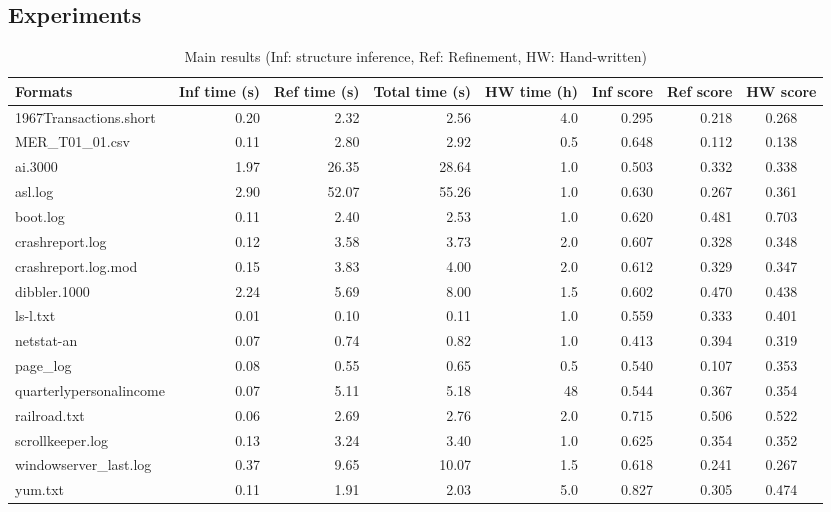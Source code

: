 \subsection{Experiments}
\begin{table*}
\begin{center}
\begin{tabular}{|l||r|r|r|r||r|r|c|} \hline
Formats 	 & Inf time (s) 	& Ref time (s) 	& Total time (s) & HW time (h) & Inf score 	&Ref score	& HW score \\ \hline \hline
1967Transactions.short & 0.20&      2.32&      2.56 	& 4.0 & 0.295 	&0.218 		&0.268		 \\ \hline
MER\_T01\_01.csv & 0.11&      2.80&      2.92 	& 0.5 & 0.648 	&0.112		&0.138		 \\ \hline
ai.3000          & 1.97&      26.35&     28.64	& 1.0 & 0.503	&0.332		&0.338		 \\ \hline
asl.log          & 2.90&      52.07&     55.26	& 1.0 & 0.630	&0.267		&0.361		 \\ \hline
boot.log         & 0.11&      2.40&      2.53 	& 1.0 & 0.620	&0.481		&0.703		 \\ \hline
crashreport.log   & 0.12&      3.58&      3.73 	& 2.0 & 0.607	&0.328		&0.348		 \\ \hline
crashreport.log.mod & 0.15&      3.83&      4.00 	& 2.0 & 0.612	&0.329		&0.347		 \\ \hline
dibbler.1000     & 2.24&      5.69&      8.00 	& 1.5 & 0.602	&0.470		&0.438		 \\ \hline
ls-l.txt         & 0.01&      0.10&      0.11 	& 1.0 & 0.559	&0.333		&0.401		 \\ \hline
netstat-an       & 0.07&      0.74&      0.82 	& 1.0 & 0.413	&0.394		&0.319		 \\ \hline
page\_log        & 0.08&      0.55&      0.65 	& 0.5 & 0.540	&0.107		&0.353		  \\ \hline
quarterlypersonalincome & 0.07&      5.11&      5.18 	& 48  & 0.544	&0.367		&0.354		\\ \hline
railroad.txt     & 0.06&      2.69&      2.76 	& 2.0 & 0.715	&0.506		&0.522		 \\ \hline
scrollkeeper.log & 0.13&      3.24&      3.40 	& 1.0 & 0.625	&0.354		&0.352		 \\ \hline
windowserver\_last.log  & 0.37&      9.65&      10.07	& 1.5 &0.618		&0.241		&0.267		 \\ \hline
yum.txt          & 0.11&      1.91&      2.03 	& 5.0 &0.827		&0.305		&0.474		 \\ \hline
\end{tabular}
\caption{Main results (Inf: structure inference, Ref: Refinement, HW: Hand-written)}
\label{tab:results}
\end{center}
\end{table*}

